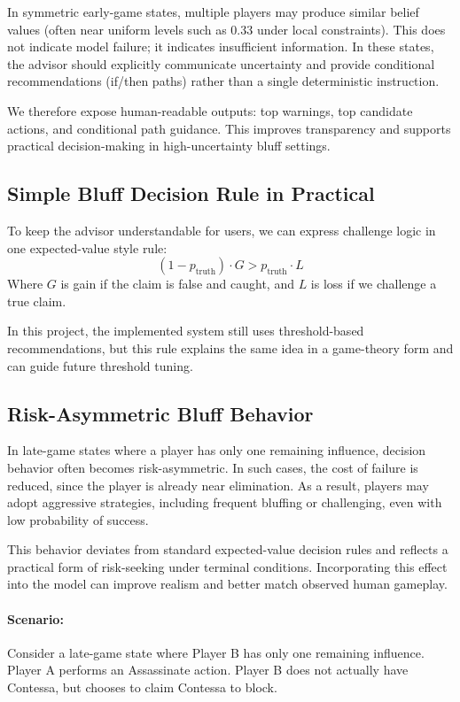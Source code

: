 \documentclass[11pt]{article}
\begin{document}
In symmetric early-game states, multiple players may produce similar belief values (often near uniform levels such as 0.33 under local constraints). This does not indicate model failure; it indicates insufficient information. In these states, the advisor should explicitly communicate uncertainty and provide conditional recommendations (if/then paths) rather than a single deterministic instruction.

We therefore expose human-readable outputs: top warnings, top candidate actions, and conditional path guidance. This improves transparency and supports practical decision-making in high-uncertainty bluff settings.

\subsection{Simple Bluff Decision Rule in Practical}
To keep the advisor understandable for users, we can express challenge logic in one expected-value style rule:
\[
(1-p_{\mathrm{truth}})\cdot G > p_{\mathrm{truth}}\cdot L
\]
Where \(G\) is gain if the claim is false and caught, and \(L\) is loss if we challenge a true claim.

In this project, the implemented system still uses threshold-based recommendations, but this rule explains the same idea in a game-theory form and can guide future threshold tuning.

\subsection{Risk-Asymmetric Bluff Behavior}
In late-game states where a player has only one remaining influence, decision behavior often becomes risk-asymmetric. In such cases, the cost of failure is reduced, since the player is already near elimination. As a result, players may adopt aggressive strategies, including frequent bluffing or challenging, even with low probability of success.

This behavior deviates from standard expected-value decision rules and reflects a practical form of risk-seeking under terminal conditions. Incorporating this effect into the model can improve realism and better match observed human gameplay.

\paragraph{Scenario:}
Consider a late-game state where Player B has only one remaining influence. Player A performs an Assassinate action. Player B does not actually have Contessa, but chooses to claim Contessa to block.
\end{document}
